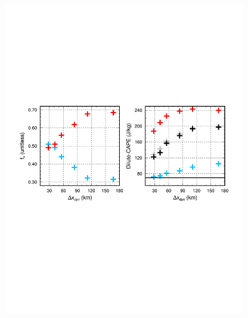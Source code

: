 \begin{figure}[t]
\begin{center}
\noindent\includegraphics[width=25pc,angle=0]{chapter6/temp_cape.pdf}\\
\end{center}
\caption{}
\label{fig:cape}
\end{figure}